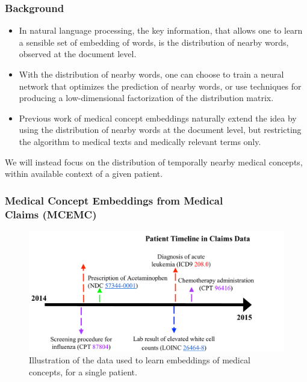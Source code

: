 \documentclass{beamer}
\begin{document}
\begin{frame}
\frametitle{Background}
\begin{itemize}
\item In natural language processing, the key
information, that allows one to learn a sensible
set of embedding of words, is 
the distribution of nearby 
words, observed at the document level. 

\bigskip

\item With the distribution of nearby words, 
one can choose to train a neural network
that optimizes the prediction of nearby words,
or use techniques for 
producing a low-dimensional factorization of 
the distribution matrix. 


\bigskip

\item Previous work of medical concept embeddings
naturally extend the idea by using the distribution
of nearby words at the document level,
but restricting the algorithm to medical texts
and medically relevant terms only. 

\end{itemize}
\end{frame}

\begin{frame}
\centering
We will instead focus on the distribution of 
temporally nearby medical concepts, within
available context of a given patient.

\end{frame}

\begin{frame}
\frametitle{Medical Concept Embeddings from
Medical \\ Claims (MCEMC)}
\begin{figure}[t]
    \centering 
    \includegraphics[width=0.8\linewidth]{figs/Figure1-claims-timeline.pdf}
    \caption{\scriptsize Illustration of the data used to learn
      embeddings of medical concepts, for a single patient.\label{fig:temporal}}
\end{figure}
\end{frame}
\end{document}
